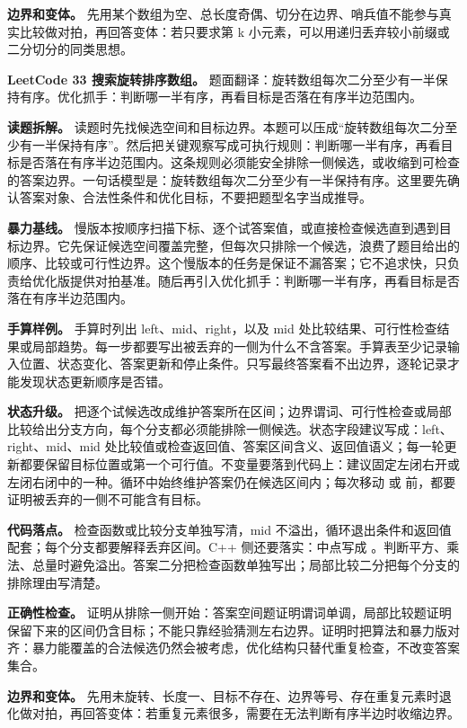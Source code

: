 \textbf{边界和变体。} 先用某个数组为空、总长度奇偶、切分在边界、哨兵值不能参与真实比较做对拍，再回答变体：若只要求第 k 小元素，可以用递归丢弃较小前缀或二分切分的同类思想。

\noindent\textbf{LeetCode 33 搜索旋转排序数组。} 题面翻译：旋转数组每次二分至少有一半保持有序。优化抓手：判断哪一半有序，再看目标是否落在有序半边范围内。

\textbf{读题拆解。} 读题时先找候选空间和目标边界。本题可以压成“旋转数组每次二分至少有一半保持有序”。然后把关键观察写成可执行规则：判断哪一半有序，再看目标是否落在有序半边范围内。这条规则必须能安全排除一侧候选，或收缩到可检查的答案边界。一句话模型是：旋转数组每次二分至少有一半保持有序。这里要先确认答案对象、合法性条件和优化目标，不要把题型名字当成推导。

\textbf{暴力基线。} 慢版本按顺序扫描下标、逐个试答案值，或直接检查候选直到遇到目标边界。它先保证候选空间覆盖完整，但每次只排除一个候选，浪费了题目给出的顺序、比较或可行性边界。这个慢版本的任务是保证不漏答案；它不追求快，只负责给优化版提供对拍基准。随后再引入优化抓手：判断哪一半有序，再看目标是否落在有序半边范围内。

\textbf{手算样例。} 手算时列出 left、mid、right，以及 mid 处比较结果、可行性检查结果或局部趋势。每一步都要写出被丢弃的一侧为什么不含答案。手算表至少记录输入位置、状态变化、答案更新和停止条件。只写最终答案看不出边界，逐轮记录才能发现状态更新顺序是否错。

\textbf{状态升级。} 把逐个试候选改成维护答案所在区间；边界谓词、可行性检查或局部比较给出分支方向，每个分支都必须能排除一侧候选。状态字段建议写成：left、right、mid、mid 处比较值或检查返回值、答案区间含义、返回值语义；每一轮更新都要保留目标位置或第一个可行值。不变量要落到代码上：建议固定左闭右开或左闭右闭中的一种。循环中始终维护答案仍在候选区间内；每次移动  或  前，都要证明被丢弃的一侧不可能含有目标。

\textbf{代码落点。} 检查函数或比较分支单独写清，mid 不溢出，循环退出条件和返回值配套；每个分支都要解释丢弃区间。C++ 侧还要落实：中点写成 。判断平方、乘法、总量时避免溢出。答案二分把检查函数单独写出；局部比较二分把每个分支的排除理由写清楚。

\textbf{正确性检查。} 证明从排除一侧开始：答案空间题证明谓词单调，局部比较题证明保留下来的区间仍含目标；不能只靠经验猜测左右边界。证明时把算法和暴力版对齐：暴力能覆盖的合法候选仍然会被考虑，优化结构只替代重复检查，不改变答案集合。

\textbf{边界和变体。} 先用未旋转、长度一、目标不存在、边界等号、存在重复元素时退化做对拍，再回答变体：若重复元素很多，需要在无法判断有序半边时收缩边界。

